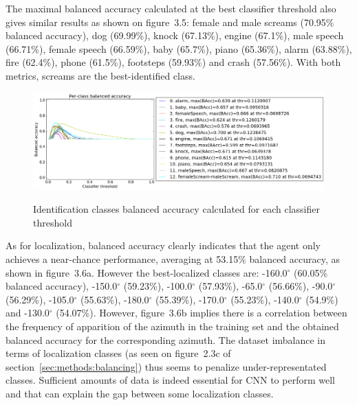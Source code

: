 The maximal balanced accuracy calculated at the best classifier threshold also gives similar results as shown on figure~3.5:
female and male screams (70.95\% balanced accuracy),
dog (69.99\%),
knock (67.13\%),
engine (67.1\%),
male speech (66.71\%),
female speech (66.59\%),
baby (65.7\%),
piano (65.36\%),
alarm (63.88\%),
fire (62.4\%),
phone (61.5\%),
footsteps (59.93\%) and
crash (57.56\%). With both metrics, screams are the best-identified class.

\begin{figure}
	\hspace*{-4cm}
	\centering
	\includegraphics[scale=0.45]{images-architecture-mixed/id_max_bacc}
	\label{fig:results:id_max_bacc}
\caption{Identification classes balanced accuracy calculated for each classifier threshold}
\end{figure}

As for localization, balanced accuracy clearly indicates that the agent only achieves a near-chance performance, averaging at 53.15\% balanced accuracy, as shown in figure~3.6a. However the best-localized classes are:
-160.0$^\circ$ (60.05\% balanced accuracy),
-150.0$^\circ$ (59.23\%),
-100.0$^\circ$ (57.93\%),
-65.0$^\circ$ (56.66\%),
-90.0$^\circ$ (56.29\%),
-105.0$^\circ$ (55.63\%),
-180.0$^\circ$ (55.39\%),
-170.0$^\circ$ (55.23\%),
-140.0$^\circ$ (54.9\%) and
-130.0$^\circ$ (54.07\%).
However, figure~3.6b implies there is a correlation between the frequency of apparition of the azimuth in the training set and the obtained balanced accuracy for the corresponding azimuth. The dataset imbalance in terms of localization classes (as seen on figure~2.3c of section~\ref{sec:methods:balancing}) thus seems to penalize under-representated classes. Sufficient amounts of data is indeed essential for CNN to perform well and that can explain the gap between some localization classes. \\

